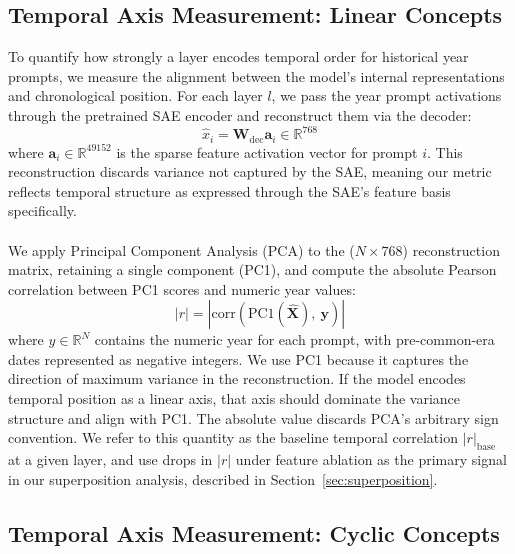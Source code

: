 \documentclass[11pt]{article}
\begin{document}
\subsection{Temporal Axis Measurement: Linear Concepts}


To quantify how strongly a layer encodes temporal order for historical year prompts, we measure the alignment 
between the model's internal representations and chronological position. For each layer $l$, we pass the year prompt activations
through the pretrained SAE encoder and reconstruct them via the decoder:
$$\hat{x}_i = \mathbf{W}_{\text{dec}}\mathbf{a}_i \in \mathbb{R}^{768}$$
where $\mathbf{a}_i \in \mathbb{R}^{49152}$ is the sparse feature activation vector for prompt $i$. This reconstruction discards variance
not captured by the SAE, meaning our metric reflects temporal structure as expressed through the SAE's feature basis specifically.
\\
\\
We apply Principal Component Analysis (PCA) to the ($N \times 768$) reconstruction matrix, retaining a single component (PC1), and compute 
the absolute Pearson correlation between PC1 scores and numeric year values:
$$|r| = \left| \text{corr}\left(\text{PC1}(\hat{\mathbf{X}}),\ \mathbf{y}\right) \right|$$
where $y \in \mathbb{R}^N$ contains the numeric year for each prompt, with pre-common-era dates represented as negative integers.
We use PC1 because it captures the direction of maximum variance in the reconstruction. If the model encodes temporal position as a linear axis,
that axis should dominate the variance structure and align with PC1. The absolute value discards PCA's arbitrary sign convention. 
We refer to this quantity as the baseline temporal correlation $|r|_{\text{base}}$ at a given layer, and use drops in $|r|$ under
feature ablation as the primary signal in our superposition analysis, described in Section~\ref{sec:superposition}.


\subsection{Temporal Axis Measurement: Cyclic Concepts}
\end{document}

